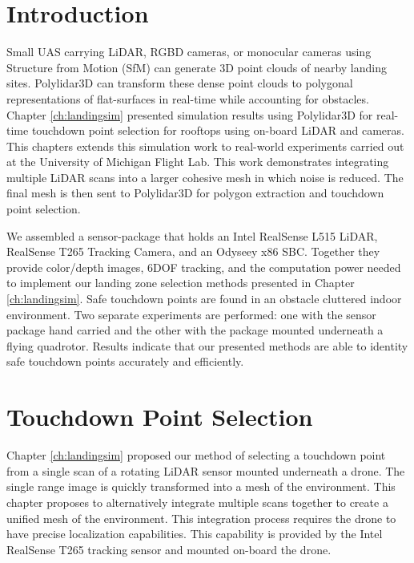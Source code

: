 \section{Introduction}

Small UAS carrying LiDAR, RGBD cameras, or monocular cameras using Structure from Motion (SfM) can generate 3D point clouds of nearby landing sites. Polylidar3D can transform these dense point clouds to polygonal representations of flat-surfaces in real-time while accounting for obstacles. Chapter \ref{ch:landingsim} presented simulation results using Polylidar3D for real-time touchdown point selection for rooftops using on-board LiDAR and cameras. This chapters extends this simulation work to real-world experiments carried out at the University of Michigan Flight Lab. This work demonstrates integrating multiple LiDAR scans into a larger cohesive mesh in which noise is reduced. The final mesh is then sent to Polylidar3D for polygon extraction and touchdown point selection.

We assembled a sensor-package that holds an Intel RealSense L515 LiDAR, RealSense T265 Tracking Camera, and an Odyseey x86 \acf{SBC}. Together they provide color/depth images, 6DOF tracking, and the computation power needed to implement our landing zone selection methods presented in Chapter \ref{ch:landingsim}. Safe touchdown points are found in an obstacle cluttered indoor environment. Two separate experiments are performed: one with the sensor package hand carried and the other with the package mounted underneath a flying quadrotor.  Results indicate that our presented methods are able to identity safe touchdown points accurately and efficiently.

\section{Touchdown Point Selection}\label{sec:ch7_volume_integration}

Chapter \ref{ch:landingsim} proposed our method of selecting a touchdown point from a single scan of a rotating LiDAR sensor mounted underneath a drone. The single range image is quickly transformed into a mesh of the environment.  This chapter proposes to alternatively integrate multiple scans together to create a unified mesh of the environment. This integration process requires the drone to have precise localization capabilities. This capability is provided by the Intel RealSense T265 tracking sensor and mounted on-board the drone. 

